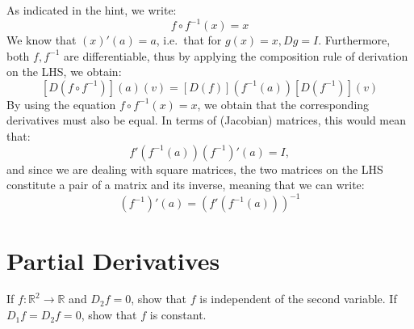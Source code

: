 \begin{solution}

    As indicated in the hint, we write:
    $$f \circ f^{-1}(x) = x$$
    We know that $(x)'(a) = a$, i.e.\ that for $g(x) = x, Dg = I$.
    Furthermore, both $f, f^{-1}$ are differentiable, thus by applying the composition rule of derivation on the LHS, we obtain:
    $$[D (f \circ f^{-1})](a)(v) = [D(f)](f^{-1}(a))[D (f^{-1})] (v)$$
    By using the equation $f \circ f^{-1}(x) = x$, we obtain that the corresponding derivatives must also be equal.
    In terms of (Jacobian) matrices, this would mean that:
    $$f'(f^{-1}(a))(f^{-1})'(a) = I,$$
    and since we are dealing with square matrices, the two matrices on the LHS constitute a pair of a matrix and its inverse, meaning that we can write:
    $$(f^{-1})'(a) = (f'(f^{-1}(a)))^{-1}$$
\end{solution}

\section{Partial Derivatives}

\begin{exercise}{22}
    If $f: \mathbb{R}^2 \rightarrow \mathbb{R}$ and $D_2 f = 0$, show that $f$ is independent of the second variable.
    If $D_1 f = D_2 f = 0$, show that $f$ is constant.
\end{exercise}

